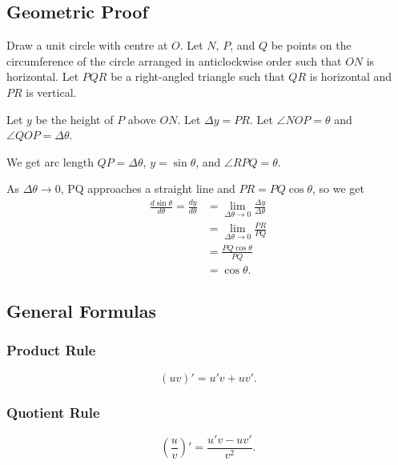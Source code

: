 \subsection{Geometric Proof}
Draw a unit circle with centre at \( O \). Let \( N \), \( P \), and \(
Q \) be points on the circumference of the circle arranged in
anticlockwise order such that \( ON \) is horizontal. Let \( PQR \) be a
right-angled triangle such that \( QR \) is horizontal and \( PR \) is
vertical.

Let \( y \) be the height of \( P \) above \( ON \). Let \( \Delta y =
PR \). Let \( \angle NOP = \theta \) and \( \angle QOP = \Delta \theta
\).

We get arc length \( QP = \Delta \theta \), \( y = \sin \theta \), and
\( \angle RPQ = \theta \).

As \( \Delta \theta \to 0 \), PQ approaches a straight line and \( PR =
PQ \cos \theta \), so we get
\begin{align*}
    \frac{d \sin \theta}{d \theta}
          = \frac{dy}{d\theta}
        & = \lim_{\Delta \theta \to 0} \frac{\Delta y}{\Delta \theta} \\
        & = \lim_{\Delta \theta \to 0} \frac{PR}{PQ} \\
        & = \frac{PQ \cos \theta}{PQ} \\
        & = \cos \theta.
\end{align*}
\subsection{General Formulas}
\subsubsection{Product Rule}
\[
    (uv)' = u'v + uv'.
\]

\subsubsection{Quotient Rule}
\[
    \left( \frac{u}{v} \right)' = \frac{u'v - uv'}{v^2}.
\]
